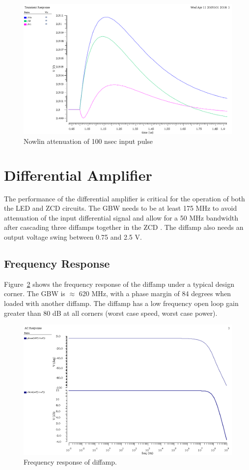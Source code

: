 \documentclass[12pt,oneside,final]{siuethesis}
\theoremstyle{definition}
\begin{document}
\newpage
\begin{figure}[htbp!]
\centering
\includegraphics[scale=.55,keepaspectratio=true]{data/nowlin_100n_atten.png}
\caption{Nowlin attenuation of 100 nsec input pulse}
\label{fig:atten100}
\end{figure}
\section{Differential Amplifier}
\par The performance of the differential amplifier is critical for the operation of both the LED and ZCD circuits. The GBW needs to be at least 175 MHz to avoid attenuation of the input differential signal and allow for a 50 MHz bandwidth after cascading three diffamps together in the ZCD \cite{CFD}. The diffamp also needs an output voltage swing between 0.75 and 2.5 V. 
\subsection{Frequency Response}
\par Figure~\ref{fig:freq} shows the frequency response of the diffamp under a typical design corner. The GBW is $\approx$ 620 MHz, with a phase margin of 84 degrees when loaded with another diffamp. The diffamp has a low frequency open loop gain greater than 80 dB at all corners (worst case speed, worst case power). 
\begin{figure}[htbp!]
\centering
\includegraphics[scale=.55,keepaspectratio=true]{images/diffamp_mag_phase.png}
\caption{Frequency response of diffamp.}
\label{fig:freq}
\end{figure}
\end{document}
